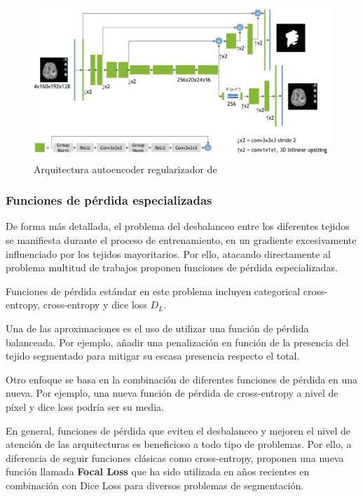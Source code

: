 			\begin{figure}[H]
				\centering
				\includegraphics[width=1.0\linewidth]{imagenes/myroenko2019.png}
				\caption{Arquitectura autoencoder regularizador de \cite{myronenko20193d}}
			\end{figure}
			
				
			\subsubsection{Funciones de pérdida especializadas}
			
			De forma más detallada, el problema del desbalanceo entre los diferentes tejidos se manifiesta durante el proceso de entrenamiento, en un gradiente excesivamente influenciado por los tejidos mayoritarios. Por ello, atacando directamente al problema multitud de trabajos proponen funciones de pérdida especializadas.
			
			Funciones de pérdida estándar en este problema incluyen categorical cross-entropy, cross-entropy y dice loss $D_{L}$.
			
			Una de las aproximaciones es el uso de utilizar una función de pérdida balanceada. Por ejemplo, añadir una penalización en función de la presencia del tejido segmentado para mitigar su escasa presencia respecto el total.
			
			Otro enfoque se basa en la combinación de diferentes funciones de pérdida en una nueva. Por ejemplo, una nueva función de pérdida de cross-entropy a nivel de píxel y dice loss podría ser su media.
			
			En general, funciones de pérdida que eviten el desbalanceo y mejoren el nivel de atención de las arquitecturas es beneficioso a todo tipo de problemas. Por ello, a diferencia de seguir funciones clásicas como cross-entropy, \cite{lin2017focal} proponen una nueva función llamada \textbf{Focal Loss} que ha sido utilizada en años recientes en combinación con Dice Loss para diversos problemas de segmentación.
			
